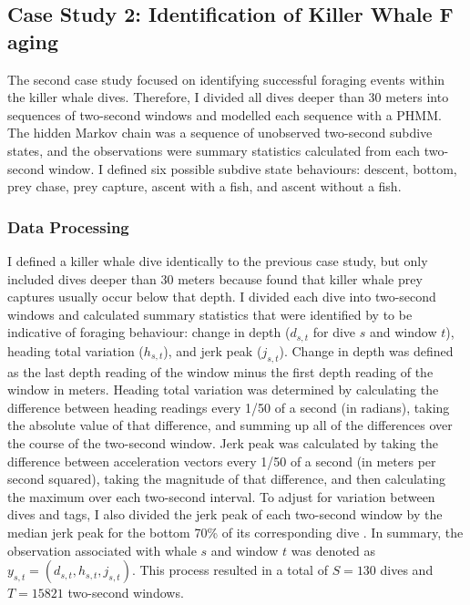 \subsection{Case Study 2: Identification of Killer Whale F aging}

\label{sec:chp3_cs2}

The second case study focused on identifying successful foraging events within the killer whale dives. Therefore, I divided all dives deeper than 30 meters into sequences of two-second windows and modelled each sequence with a PHMM. %
The hidden Markov chain was a sequence of unobserved two-second subdive states, and the observations were summary statistics calculated from each two-second window. I defined six possible subdive state behaviours: descent, bottom, prey chase, prey capture, ascent with a fish, and ascent without a fish. %

\subsubsection{Data Processing}

I defined a killer whale dive identically to the previous case study, but only included dives deeper than 30 meters because \citet{Wright:2017} found that killer whale prey captures usually occur below that depth. I divided each dive into two-second windows and calculated summary statistics that were identified by \citet{Tennessen:2019a} to be indicative of foraging behaviour: change in depth ($d_{s,t}$ for dive $s$ and window $t$), heading total variation ($h_{s,t}$), and jerk peak ($j_{s,t}$).  Change in depth was defined as the last depth reading of the window minus the first depth reading of the window in meters. Heading total variation was determined by calculating the difference between heading readings every 1/50 of a second (in radians), taking the absolute value of that difference, and summing up all of the differences over the course of the two-second window. Jerk peak was calculated by taking the difference between acceleration vectors every 1/50 of a second (in meters per second squared), taking the magnitude of that difference, and then calculating the maximum over each two-second interval. To adjust for variation between dives and tags, I also divided the jerk peak of each two-second window by the median jerk peak for the bottom 70\% of its corresponding dive \citep{Tennessen:2019a}. In summary, the observation associated with whale $s$ and window $t$ was denoted as $y_{s,t} = (d_{s,t},h_{s,t},j_{s,t})$. This process resulted in a total of $S = 130$ dives and $T = 15821$ two-second windows.

